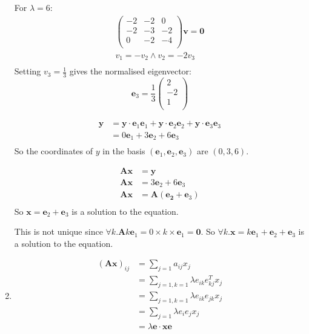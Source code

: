 \documentclass[10pt,oneside,a4paper]{article}
\begin{document}
\begin{enumerate}
For $\lambda = 6$:
\begin{gather*}
\begin{pmatrix}
-2 & -2 & 0 \\
-2 & -3 & -2 \\
0 & -2 & -4 \\
\end{pmatrix}
\mathbf{v} = \mathbf{0} \\
v_1 = -v_2 \wedge v_2 = -2v_3 \\
\end{gather*}
Setting $v_3 =\frac{1}{3} $ gives the normalised eigenvector:
\[
\mathbf{e}_3 =\frac{1}{3} \begin{pmatrix}
2 \\ -2 \\ 1 \\
\end{pmatrix}
\]

\[
\begin{split}
\mathbf{y} &= \mathbf{y}\cdot \mathbf{e}_1 \mathbf{e}_1 + \mathbf{y}\cdot \mathbf{e}_2 \mathbf{e}_2 +
\mathbf{y}\cdot \mathbf{e}_3 \mathbf{e}_3 \\
&= 0\mathbf{e}_1 + 3\mathbf{e}_2 + 6\mathbf{e}_3 \\
\end{split}
\]
So the coordinates of $y$ in the basis $(\mathbf{e}_1, \mathbf{e}_2, \mathbf{e}_3)$ are $(0, 3, 6)$.

\[
\begin{split}
\mathbf{Ax} &= \mathbf{y} \\
\mathbf{Ax} &= 3\mathbf{e}_2 + 6\mathbf{e}_3 \\
\mathbf{Ax} &= \mathbf{A}(\mathbf{e_2} + \mathbf{e}_3) \\
\end{split}
\]
So $\mathbf{x} = \mathbf{e}_2 + \mathbf{e}_3 $ is a solution to the equation.

This is not unique since $\forall k. \mathbf{A}k\mathbf{e}_1 = 0 \times k \times \mathbf{e}_1 = \mathbf{0}$.
So $\forall k. \mathbf{x} = k\mathbf{e}_1 + \mathbf{e}_2 + \mathbf{e}_3$ is a solution to the equation.

\item

\[
\begin{split}
\left( \mathbf{Ax}  \right)_{ij} &= \sum^{}_{j=1} a_{ij}x_j \\
&= \sum^{}_{j=1, k=1} \lambda e_{ik}e^T_{kj}x_j \\
&= \sum^{}_{j=1, k=1} \lambda e_{ik}e_{jk}x_j \\
&= \sum^{}_{j=1} \lambda e_{i}e_j x_j \\
&= \lambda \mathbf{e} \cdot \mathbf{x} \mathbf{e} \\
\end{split}
\]


\end{enumerate}
\end{document}
